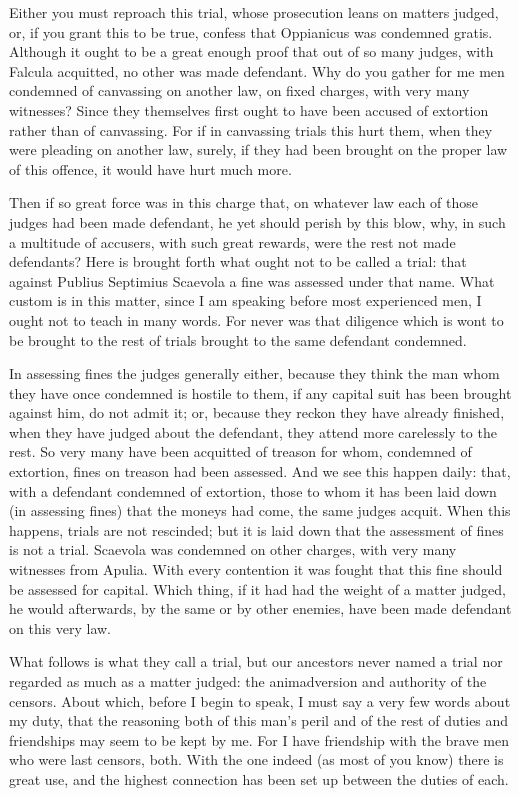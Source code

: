  Either you must reproach this trial, whose prosecution leans on matters judged, or, if you grant this to be true, confess that Oppianicus was condemned gratis. Although it ought to be a great enough proof that out of so many judges, with Falcula acquitted, no other was made defendant. Why do you gather for me men condemned of canvassing on another law, on fixed charges, with very many witnesses? Since they themselves first ought to have been accused of extortion rather than of canvassing. For if in canvassing trials this hurt them, when they were pleading on another law, surely, if they had been brought on the proper law of this offence, it would have hurt much more.

 Then if so great force was in this charge that, on whatever law each of those judges had been made defendant, he yet should perish by this blow, why, in such a multitude of accusers, with such great rewards, were the rest not made defendants? Here is brought forth what ought not to be called a trial: that against Publius Septimius Scaevola a fine was assessed under that name. What custom is in this matter, since I am speaking before most experienced men, I ought not to teach in many words. For never was that diligence which is wont to be brought to the rest of trials brought to the same defendant condemned.

 In assessing fines the judges generally either, because they think the man whom they have once condemned is hostile to them, if any capital suit has been brought against him, do not admit it; or, because they reckon they have already finished, when they have judged about the defendant, they attend more carelessly to the rest. So very many have been acquitted of treason for whom, condemned of extortion, fines on treason had been assessed. And we see this happen daily: that, with a defendant condemned of extortion, those to whom it has been laid down (in assessing fines) that the moneys had come, the same judges acquit. When this happens, trials are not rescinded; but it is laid down that the assessment of fines is not a trial. Scaevola was condemned on other charges, with very many witnesses from Apulia. With every contention it was fought that this fine should be assessed for capital. Which thing, if it had had the weight of a matter judged, he would afterwards, by the same or by other enemies, have been made defendant on this very law.

 What follows is what they call a trial, but our ancestors never named a trial nor regarded as much as a matter judged: the animadversion and authority of the censors. About which, before I begin to speak, I must say a very few words about my duty, that the reasoning both of this man's peril and of the rest of duties and friendships may seem to be kept by me. For I have friendship with the brave men who were last censors, both. With the one indeed (as most of you know) there is great use, and the highest connection has been set up between the duties of each.

